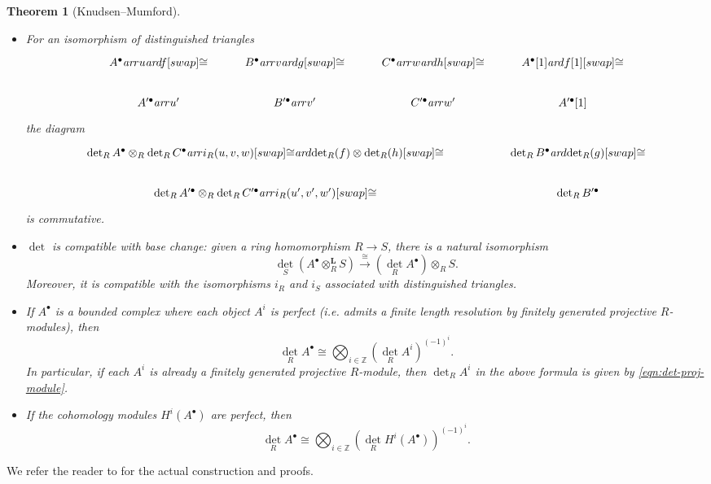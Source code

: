 \documentclass[10pt,a4paper,oneside,draft]{article}
\newcommand{\ZZ}{\mathbb{Z}}
\renewcommand{\det}{\operatorname{det}}
\newcommand{\ar}{\text{\it ar}}
\theoremstyle{myplain}
\newtheorem{theorem}{Theorem}[section]
\theoremstyle{mydefinition}
\numberwithin{equation}{section}
\begin{document}
\begin{appendices}
\begin{theorem}[Knudsen--Mumford]
\begin{itemize}
  \item For an isomorphism of distinguished triangles
    \[ \begin{tikzcd}
        A^\bullet \ar{r}{u}\ar{d}{f}[swap]{\cong} & B^\bullet \ar{r}{v}\ar{d}{g}[swap]{\cong} & C^\bullet \ar{r}{w}\ar{d}{h}[swap]{\cong} & A^\bullet [1]\ar{d}{f[1]}[swap]{\cong} \\
        A'^\bullet \ar{r}{u'} & B'^\bullet \ar{r}{v'} & C'^\bullet \ar{r}{w'} & A'^\bullet [1]
      \end{tikzcd} \]
    the diagram
    \[ \begin{tikzcd}[column sep=5em]
        \det_R A^\bullet \otimes_R \det_R C^\bullet \ar{r}{i_R (u,v,w)}[swap]{\cong}\ar{d}{\det_R (f) \otimes \det_R (h)}[swap]{\cong} & \det_R B^\bullet\ar{d}{\det_R (g)}[swap]{\cong} \\
        \det_R A'^\bullet \otimes_R \det_R C'^\bullet \ar{r}{i_R (u',v',w')}[swap]{\cong} & \det_R B'^\bullet
      \end{tikzcd} \]
    is commutative.

  \item $\det$ is compatible with base change: given a ring homomorphism
    $R\to S$, there is a natural isomorphism
    \[ \det_S (A^\bullet \otimes_R^\mathbf{L} S)
      \xrightarrow{\cong}
      (\det_R A^\bullet) \otimes_R S. \]
    Moreover, it is compatible with the isomorphisms $i_R$ and $i_S$ associated
    with distinguished triangles.

  \item If $A^\bullet$ is a bounded complex where each object $A^i$ is perfect
    (i.e. admits a finite length resolution by finitely generated projective
    $R$-modules), then
    $$\det_R A^\bullet \cong \bigotimes_{i\in \ZZ} (\det_R A^i)^{(-1)^i}.$$
    In particular, if each $A^i$ is already a finitely generated projective
    $R$-module, then $\det_R A^i$ in the above formula is given by
    \eqref{eqn:det-proj-module}.

  \item If the cohomology modules $H^i (A^\bullet)$ are perfect, then
    \begin{equation}
      \label{eqn:det-in-terms-of-cohomology}
      \det_R A^\bullet \cong
      \bigotimes_{i\in \ZZ} (\det_R H^i (A^\bullet))^{(-1)^i}.
    \end{equation}
  \end{itemize}
\end{theorem}

We refer the reader to \cite{Knudsen-Mumford-1976} for the actual construction
and proofs.


\end{appendices}
\end{document}
